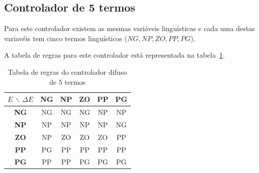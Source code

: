 \documentclass{article}
\begin{document}
\clearpage

\subsection{Controlador de 5 termos}
Para este controlador existem as mesmas variáveis linguísticas e cada uma destas variavéis tem cinco termos linguísticos (${NG,NP,ZO,PP,PG}$).

A tabela de regras para este controlador está representada na tabela~\ref{5_terms_fuzzy}.

\begin{table}[!h]
\centering
	\caption{Tabela de regras do controlador difuso de 5 termos}
	\label{5_terms_fuzzy}
	\begin{tabular}{|c|c|c|c|c|c|}
	\hline
	$E$ $\backslash$ $\Delta E$ & \textbf{NG} & \textbf{NP} & \textbf{ZO} & \textbf{PP} & \textbf{PG} \\ 
	\hline 
	\textbf{NG} & NG & NG & NG & NP & NP \\ 
	\hline 
	\textbf{NP} & NP & NP & NP & NP & NG \\ 
	\hline 
	\textbf{ZO} & NP & ZO & ZO & ZO & PP \\ 
	\hline
	\textbf{PP} & PG & PP & PP & PP & PP \\ 
	\hline 
	\textbf{PG} & PP & PP & PG & PG & PG \\ 
	\hline 
	\end{tabular} 
\end{table}
\end{document}
